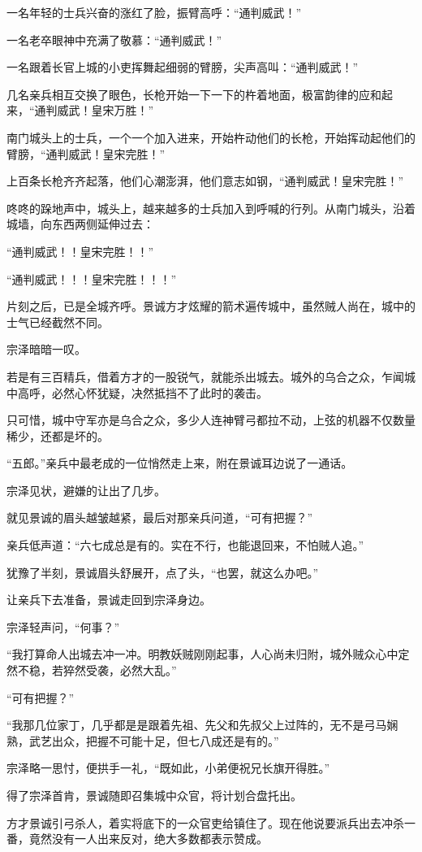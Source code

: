 一名年轻的士兵兴奋的涨红了脸，振臂高呼：“通判威武！”

一名老卒眼神中充满了敬慕：“通判威武！”

一名跟着长官上城的小吏挥舞起细弱的臂膀，尖声高叫：“通判威武！”

几名亲兵相互交换了眼色，长枪开始一下一下的杵着地面，极富韵律的应和起来，“通判威武！皇宋万胜！”

南门城头上的士兵，一个一个加入进来，开始杵动他们的长枪，开始挥动起他们的臂膀，“通判威武！皇宋完胜！”

上百条长枪齐齐起落，他们心潮澎湃，他们意志如钢，“通判威武！皇宋完胜！”

咚咚的跺地声中，城头上，越来越多的士兵加入到呼喊的行列。从南门城头，沿着城墙，向东西两侧延伸过去：

“通判威武！！皇宋完胜！！”

“通判威武！！！皇宋完胜！！！”

片刻之后，已是全城齐呼。景诚方才炫耀的箭术遍传城中，虽然贼人尚在，城中的士气已经截然不同。

宗泽暗暗一叹。

若是有三百精兵，借着方才的一股锐气，就能杀出城去。城外的乌合之众，乍闻城中高呼，必然心怀犹疑，决然抵挡不了此时的袭击。

只可惜，城中守军亦是乌合之众，多少人连神臂弓都拉不动，上弦的机器不仅数量稀少，还都是坏的。

“五郎。”亲兵中最老成的一位悄然走上来，附在景诚耳边说了一通话。

宗泽见状，避嫌的让出了几步。

就见景诚的眉头越皱越紧，最后对那亲兵问道，“可有把握？”

亲兵低声道：“六七成总是有的。实在不行，也能退回来，不怕贼人追。”

犹豫了半刻，景诚眉头舒展开，点了头，“也罢，就这么办吧。”

让亲兵下去准备，景诚走回到宗泽身边。

宗泽轻声问，“何事？”

“我打算命人出城去冲一冲。明教妖贼刚刚起事，人心尚未归附，城外贼众心中定然不稳，若猝然受袭，必然大乱。”

“可有把握？”

“我那几位家丁，几乎都是是跟着先祖、先父和先叔父上过阵的，无不是弓马娴熟，武艺出众，把握不可能十足，但七八成还是有的。”

宗泽略一思忖，便拱手一礼，“既如此，小弟便祝兄长旗开得胜。”

得了宗泽首肯，景诚随即召集城中众官，将计划合盘托出。

方才景诚引弓杀人，着实将底下的一众官吏给镇住了。现在他说要派兵出去冲杀一番，竟然没有一人出来反对，绝大多数都表示赞成。

